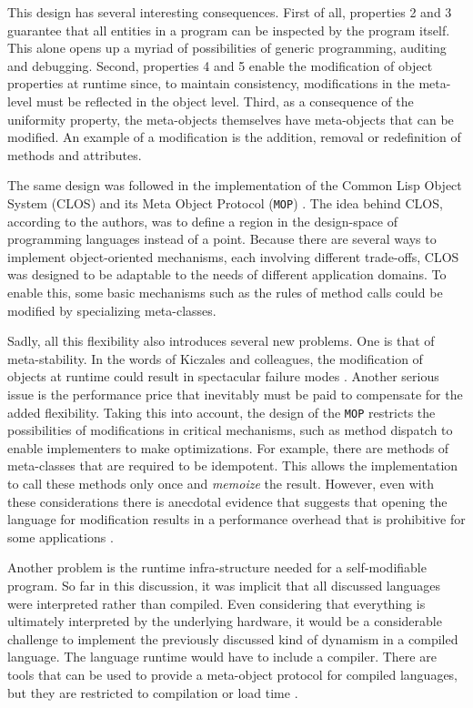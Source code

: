 This design has several interesting consequences. First of all, properties 2 and 3 guarantee that all entities in a program can be
inspected by the program itself. This alone opens up a myriad of possibilities of generic programming, auditing and debugging.
Second, properties 4 and 5 enable the modification of object properties at runtime since, to maintain consistency, modifications
in the meta-level must be reflected in the object level. Third, as a consequence of the uniformity property, the meta-objects themselves
have meta-objects that can be modified. An example of a modification is the addition, removal or redefinition of methods and attributes.

The same design was followed in the implementation of the Common Lisp Object System (CLOS) and its Meta Object Protocol (\texttt{MOP}) \cite{Kiczales}.
The idea behind CLOS, according to the authors, was to define a region in the design-space of programming languages instead of
a point. Because there are several ways to implement object-oriented mechanisms, each involving different trade-offs, CLOS was
designed to be adaptable to the needs of different application domains. To enable this, some basic mechanisms such as the
rules of method calls could be modified by specializing meta-classes.

Sadly, all this flexibility also introduces several new problems. One is that of meta-stability. In the words of Kiczales and colleagues,
the modification of objects at runtime could result in spectacular failure modes \cite{Kiczales}. Another serious issue is the performance price
that inevitably must be paid to compensate for the added flexibility. Taking this into account, the design of the \texttt{MOP} restricts
the possibilities of modifications in critical mechanisms, such as method dispatch to enable implementers to make optimizations.
For example, there are methods of meta-classes that are required to be idempotent. This allows the implementation to call
these methods only once and \emph{memoize} the result. However, even with these considerations there is anecdotal evidence
that suggests that opening the language for modification results in a performance overhead that is prohibitive for some applications \cite{Lee}.

Another problem is the runtime infra-structure needed for a self-modifiable program. So far in this discussion, it was implicit
that all discussed languages were interpreted rather than compiled. Even considering that everything is ultimately interpreted
by the underlying hardware, it would be a considerable challenge to implement the previously discussed kind of dynamism in
a compiled language. The language runtime would have to include a compiler. There are tools that can be used to provide
a meta-object protocol for compiled languages, but they are restricted to compilation or load time \cite{Chiba95} \cite{Chiba2000}.

